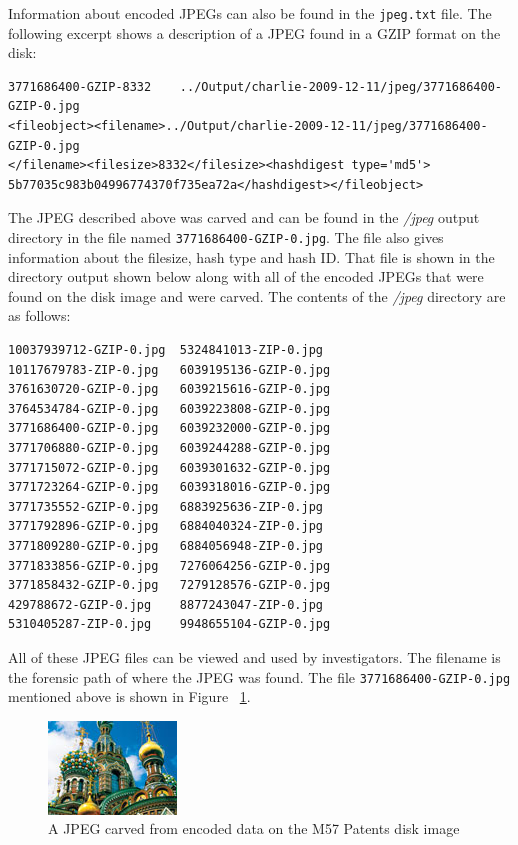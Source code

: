 Information about encoded JPEGs can also be found in the \texttt{jpeg.txt} file. The following excerpt shows a description of a JPEG found in a GZIP format on the disk:
\lstset{style=customfile}
\begin{lstlisting}
3771686400-GZIP-8332	../Output/charlie-2009-12-11/jpeg/3771686400-GZIP-0.jpg
<fileobject><filename>../Output/charlie-2009-12-11/jpeg/3771686400-GZIP-0.jpg
</filename><filesize>8332</filesize><hashdigest type='md5'>
5b77035c983b04996774370f735ea72a</hashdigest></fileobject>
\end{lstlisting}
The JPEG described above was carved and can be found in the \textit{/jpeg} output directory in the file named \texttt{3771686400-GZIP-0.jpg}. The file also gives information about the filesize, hash type and hash ID. That file is shown in the  directory output shown below along with all of the encoded JPEGs that were found on the disk image and were carved. The contents of the \textit{/jpeg} directory are as follows:

\begingroup
\footnotesize
\begin{Verbatim} 
10037939712-GZIP-0.jpg  5324841013-ZIP-0.jpg
10117679783-ZIP-0.jpg   6039195136-GZIP-0.jpg
3761630720-GZIP-0.jpg   6039215616-GZIP-0.jpg
3764534784-GZIP-0.jpg   6039223808-GZIP-0.jpg
3771686400-GZIP-0.jpg   6039232000-GZIP-0.jpg
3771706880-GZIP-0.jpg   6039244288-GZIP-0.jpg
3771715072-GZIP-0.jpg   6039301632-GZIP-0.jpg
3771723264-GZIP-0.jpg   6039318016-GZIP-0.jpg
3771735552-GZIP-0.jpg   6883925636-ZIP-0.jpg
3771792896-GZIP-0.jpg   6884040324-ZIP-0.jpg
3771809280-GZIP-0.jpg   6884056948-ZIP-0.jpg
3771833856-GZIP-0.jpg   7276064256-GZIP-0.jpg
3771858432-GZIP-0.jpg   7279128576-GZIP-0.jpg
429788672-GZIP-0.jpg    8877243047-ZIP-0.jpg
5310405287-ZIP-0.jpg    9948655104-GZIP-0.jpg
\end{Verbatim}
\endgroup
All of these JPEG files can be viewed and used by investigators. The filename is the forensic path of where the JPEG was found. The file \texttt{3771686400-GZIP-0.jpg} mentioned above is shown in Figure ~\ref{fig:carvedJPEG}.

\begin{figure}
	\center
	\includegraphics[scale=.90]{carvedJPEG.jpg}
	\caption{A JPEG carved from encoded data on the M57 Patents disk image}
	\label{fig:carvedJPEG}
\end{figure}

